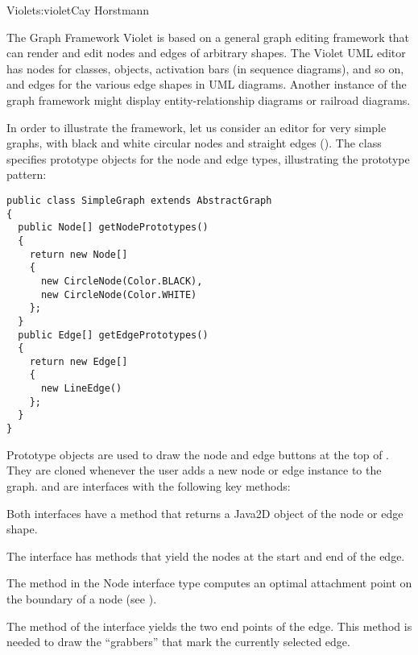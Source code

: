 \begin{aosachapter}{Violet}{s:violet}{Cay Horstmann}
\begin{aosasect1}{The Graph Framework}
Violet is based on a general graph editing framework that can render
and edit nodes and edges of arbitrary shapes. The Violet UML editor
has nodes for classes, objects, activation bars (in sequence
diagrams), and so on, and edges for the various edge shapes in UML
diagrams. Another instance of the graph framework might display
entity-relationship diagrams or railroad diagrams.


In order to illustrate the framework, let us consider an editor for
very simple graphs, with black and white circular nodes and straight
edges ().
The  class specifies prototype objects for the node
and edge types, illustrating the prototype pattern:

\pagebreak

\begin{verbatim}
public class SimpleGraph extends AbstractGraph
{
  public Node[] getNodePrototypes()
  {
    return new Node[] 
    {
      new CircleNode(Color.BLACK),
      new CircleNode(Color.WHITE)
    };
  }
  public Edge[] getEdgePrototypes()
  {
    return new Edge[] 
    {
      new LineEdge()
    };
  }
}
\end{verbatim}

Prototype objects are used to draw the node and edge buttons at the
top of . They are cloned whenever the
user adds a new node or edge instance to the graph.
 and  are interfaces with the following
key methods:

\begin{aosaitemize}

\item Both interfaces have a  method that returns a
  Java2D  object of the node or edge shape.

\item The  interface has methods that yield the nodes at
  the start and end of the edge.

\item The  method in the Node interface type
  computes an optimal attachment point on the boundary of a node (see
  ).

\item The  method of the 
  interface yields the two end points of the edge. This method is
  needed to draw the ``grabbers'' that mark the currently selected edge.


\end{aosaitemize}
\end{aosasect1}
\end{aosachapter}
